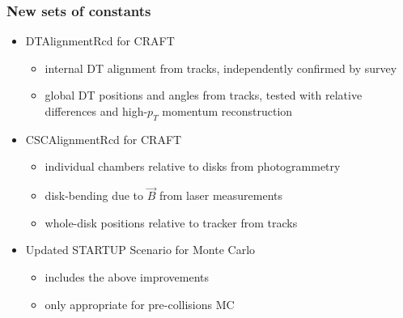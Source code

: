 \documentclass[compress]{beamer}
\begin{document}
\begin{frame}
\frametitle{New sets of constants}
\begin{itemize}\setlength{\itemsep}{0.4 cm}
\item DTAlignmentRcd for CRAFT
\begin{itemize}\setlength{\itemsep}{0.1 cm}
\item internal DT alignment from tracks, independently confirmed by survey
\item global DT positions and angles from tracks, tested with
  relative differences and high-$p_T$ momentum reconstruction
\end{itemize}

\item CSCAlignmentRcd for CRAFT
\begin{itemize}\setlength{\itemsep}{0.1 cm}
\item individual chambers relative to disks from photogrammetry
\item disk-bending due to $\vec{B}$ from laser measurements
\item whole-disk positions relative to tracker from tracks
\end{itemize}

\item Updated STARTUP Scenario for Monte Carlo
\begin{itemize}\setlength{\itemsep}{0.1 cm}
\item includes the above improvements
\item only appropriate for pre-collisions MC
\end{itemize}
\end{itemize}
\end{frame}
\end{document}
